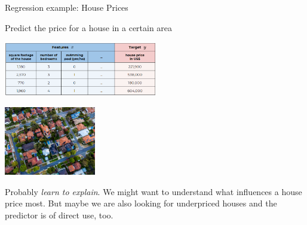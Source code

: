 \documentclass[11pt,compress,t,notes=noshow, xcolor=table]{beamer}
\begin{document}






\begin{vbframe}{Regression example: House Prices}


  Predict the price for a house in a certain area


    \begin{center}
    \includegraphics[width=0.5\textwidth]{figure_man/ml-basics-supervised-task-houses-data.png}

    \lz

    \includegraphics[width=0.3\textwidth]{figure_man/ml-basics-supervised-task-houses-pic.jpg}

    \end{center}

    Probably \textit{learn to explain}. We might want to understand what influences
    a house price most. But maybe we are also looking for underpriced houses and
    the predictor is of direct use, too.


\end{vbframe}
\end{document}
